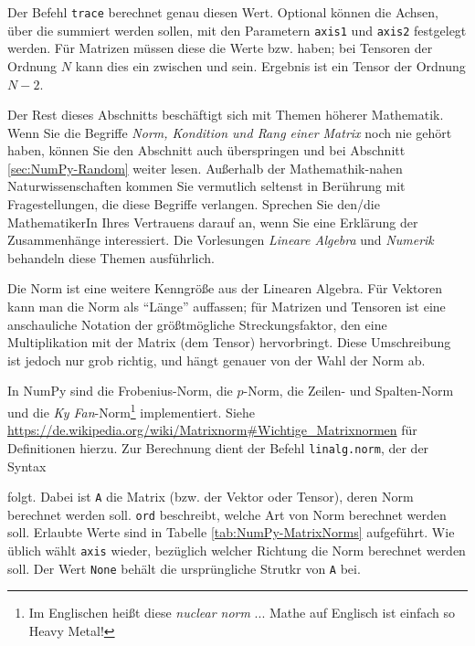 Der Befehl \texttt{trace} berechnet genau diesen Wert. Optional können die Achsen, über die summiert werden sollen, mit den Parametern \texttt{axis1} und \texttt{axis2} festgelegt werden. Für Matrizen müssen diese die Werte  bzw.  haben; bei Tensoren der Ordnung $N$ kann dies ein  zwischen  und  sein. Ergebnis ist ein Tensor der Ordnung $N-2$.

\begin{warnbox}
Der Rest dieses Abschnitts beschäftigt sich mit Themen höherer Mathematik. Wenn Sie die Begriffe \emph{Norm, Kondition und Rang einer Matrix} noch nie gehört haben, können Sie den Abschnitt auch überspringen und bei Abschnitt \ref{sec:NumPy-Random} weiter lesen. Außerhalb der Mathemathik-nahen Naturwissenschaften kommen Sie vermutlich seltenst in Berührung mit Fragestellungen, die diese Begriffe verlangen. Sprechen Sie den/die MathematikerIn Ihres Vertrauens darauf an, wenn Sie eine Erklärung der Zusammenhänge interessiert. Die Vorlesungen \emph{Lineare Algebra} und \emph{Numerik} behandeln diese Themen ausführlich.
\end{warnbox}

Die Norm ist eine weitere Kenngröße aus der Linearen Algebra. Für Vektoren kann man die Norm als \enquote{Länge} auffassen; für Matrizen und Tensoren ist eine anschauliche Notation der größtmögliche Streckungsfaktor, den eine Multiplikation mit der Matrix (dem Tensor) hervorbringt. Diese Umschreibung ist jedoch nur grob richtig, und hängt genauer von der Wahl der Norm ab.

In NumPy sind die Frobenius-Norm, die $p$-Norm, die Zeilen- und Spalten-Norm und die \emph{Ky Fan}-Norm\footnote{Im Englischen heißt diese \emph{nuclear norm} ... Mathe auf Englisch ist einfach so Heavy Metal!} implementiert. Siehe \url{https://de.wikipedia.org/wiki/Matrixnorm#Wichtige_Matrixnormen} für Definitionen hierzu. Zur Berechnung dient der Befehl \texttt{linalg.norm}, der der Syntax
\begin{center}
\end{center}
folgt. Dabei ist \texttt{A} die Matrix (bzw. der Vektor oder Tensor), deren Norm berechnet werden soll. \texttt{ord} beschreibt, welche Art von Norm berechnet werden soll. Erlaubte Werte sind in Tabelle \ref{tab:NumPy-MatrixNorms} aufgeführt. Wie üblich wählt \texttt{axis} wieder, bezüglich welcher Richtung die Norm berechnet werden soll. Der Wert \texttt{None} behält die ursprüngliche Strutkr von \texttt{A} bei.

